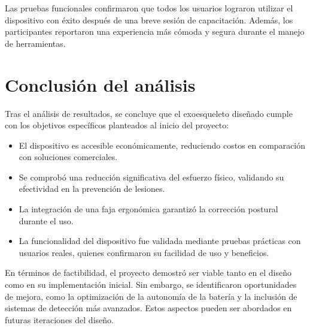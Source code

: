 Las pruebas funcionales confirmaron que todos los usuarios lograron utilizar el dispositivo con éxito después de una breve sesión de capacitación. Además, los participantes reportaron una experiencia más cómoda y segura durante el manejo de herramientas.

\section{Conclusión del análisis}
Tras el análisis de resultados, se concluye que el exoesqueleto diseñado cumple con los objetivos específicos planteados al inicio del proyecto:

\begin{itemize}
    \item El dispositivo es accesible económicamente, reduciendo costos en comparación con soluciones comerciales.
    \item Se comprobó una reducción significativa del esfuerzo físico, validando su efectividad en la prevención de lesiones.
    \item La integración de una faja ergonómica garantizó la corrección postural durante el uso.
    \item La funcionalidad del dispositivo fue validada mediante pruebas prácticas con usuarios reales, quienes confirmaron su facilidad de uso y beneficios.
\end{itemize}

En términos de factibilidad, el proyecto demostró ser viable tanto en el diseño como en su implementación inicial. Sin embargo, se identificaron oportunidades de mejora, como la optimización de la autonomía de la batería y la inclusión de sistemas de detección más avanzados. Estos aspectos pueden ser abordados en futuras iteraciones del diseño.